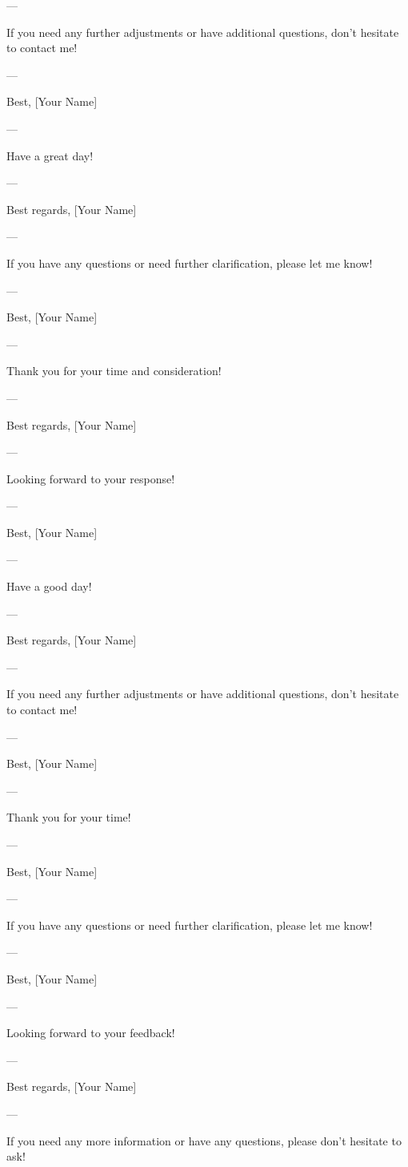 --- 

If you need any further adjustments or have additional questions, don't hesitate to contact me! 

--- 

Best,  
[Your Name]  

--- 

Have a great day! 

--- 

Best regards,  
[Your Name]  

--- 

If you have any questions or need further clarification, please let me know! 

--- 

Best,  
[Your Name]  

--- 

Thank you for your time and consideration! 

--- 

Best regards,  
[Your Name]  

--- 

Looking forward to your response! 

--- 

Best,  
[Your Name]  

--- 

Have a good day! 

--- 

Best regards,  
[Your Name]  

--- 

If you need any further adjustments or have additional questions, don't hesitate to contact me! 

--- 

Best,  
[Your Name]  

--- 

Thank you for your time! 

--- 

Best,  
[Your Name]  

--- 

If you have any questions or need further clarification, please let me know! 

--- 

Best,  
[Your Name]  

--- 

Looking forward to your feedback! 

--- 

Best regards,  
[Your Name]  

--- 

If you need any more information or have any questions, please don't hesitate to ask! 

